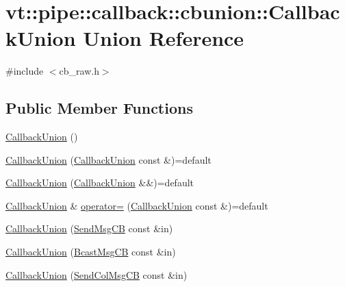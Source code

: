 \hypertarget{unionvt_1_1pipe_1_1callback_1_1cbunion_1_1_callback_union}{}\section{vt\+:\+:pipe\+:\+:callback\+:\+:cbunion\+:\+:Callback\+Union Union Reference}
\label{unionvt_1_1pipe_1_1callback_1_1cbunion_1_1_callback_union}


{\ttfamily \#include $<$cb\+\_\+raw.\+h$>$}

\subsection*{Public Member Functions}
\begin{DoxyCompactItemize}
\item 
\hyperlink{unionvt_1_1pipe_1_1callback_1_1cbunion_1_1_callback_union_a219e5ea22f5a268626daa0b2b27e8dde}{Callback\+Union} ()
\item 
\hyperlink{unionvt_1_1pipe_1_1callback_1_1cbunion_1_1_callback_union_a6545ad592dc083ac76f2e1ed78e71fdc}{Callback\+Union} (\hyperlink{unionvt_1_1pipe_1_1callback_1_1cbunion_1_1_callback_union}{Callback\+Union} const \&)=default
\item 
\hyperlink{unionvt_1_1pipe_1_1callback_1_1cbunion_1_1_callback_union_a271e6b776b4b9b0017ab313edf61f86e}{Callback\+Union} (\hyperlink{unionvt_1_1pipe_1_1callback_1_1cbunion_1_1_callback_union}{Callback\+Union} \&\&)=default
\item 
\hyperlink{unionvt_1_1pipe_1_1callback_1_1cbunion_1_1_callback_union}{Callback\+Union} \& \hyperlink{unionvt_1_1pipe_1_1callback_1_1cbunion_1_1_callback_union_abcfc7ca39974092a2631be37fbb119ed}{operator=} (\hyperlink{unionvt_1_1pipe_1_1callback_1_1cbunion_1_1_callback_union}{Callback\+Union} const \&)=default
\item 
\hyperlink{unionvt_1_1pipe_1_1callback_1_1cbunion_1_1_callback_union_a53b7f168568b474e00d84a0e608eda1b}{Callback\+Union} (\hyperlink{structvt_1_1pipe_1_1callback_1_1cbunion_1_1_send_msg_c_b}{Send\+Msg\+CB} const \&in)
\item 
\hyperlink{unionvt_1_1pipe_1_1callback_1_1cbunion_1_1_callback_union_ad777821b018851c4099f62fdaec53fd1}{Callback\+Union} (\hyperlink{structvt_1_1pipe_1_1callback_1_1cbunion_1_1_bcast_msg_c_b}{Bcast\+Msg\+CB} const \&in)
\item 
\hyperlink{unionvt_1_1pipe_1_1callback_1_1cbunion_1_1_callback_union_a56b01e7ddc0db1aec0f54f05de45beeb}{Callback\+Union} (\hyperlink{structvt_1_1pipe_1_1callback_1_1cbunion_1_1_send_col_msg_c_b}{Send\+Col\+Msg\+CB} const \&in)

\end{DoxyCompactItemize}

